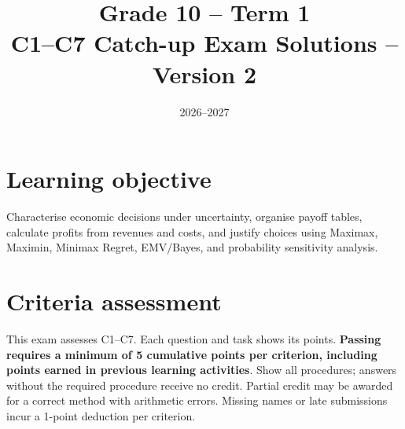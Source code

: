 \makeatletter
{}
\makeatother


\linespread{1.08}
\setlength{\parskip}{4pt}
\title{Grade 10 -- Term 1\\C1--C7 Catch-up Exam Solutions -- Version 2}
\author{}
\date{2026--2027}

\maketitle
\vspace{-1.5cm}
\setcounter{tocdepth}{1}
\setcounter{secnumdepth}{2}
\label{toc}
\tableofcontents
\clearpage
\begingroup\small
\section*{Learning objective}
Characterise economic decisions under uncertainty, organise payoff tables, calculate profits from revenues and costs, and justify choices using Maximax, Maximin, Minimax Regret, EMV/Bayes, and probability sensitivity analysis.

\section*{Criteria assessment}
This exam assesses C1--C7. Each question and task shows its points.
\textbf{Passing requires a minimum of 5 cumulative points per criterion,
including points earned in previous learning activities}.
Show all procedures; answers without the required procedure receive no credit.
Partial credit may be awarded for a correct method with arithmetic errors.
Missing names or late submissions incur a 1-point deduction per criterion.
